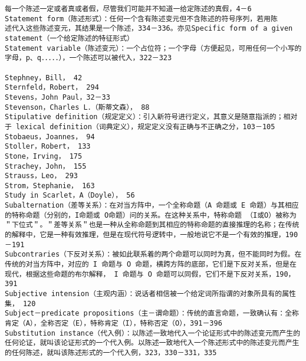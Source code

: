 \begin{verbatim}
每一个陈述一定或者真或者假，尽管我们可能并不知道一给定陈述的真假，4－6
Statement form（陈述形式）：任何一个含有陈述变元但不含陈述的符号序列，若用陈
述代入这些陈述变元，其结果是一个陈述，334－336。亦见Specific form of a given statement（一个给定陈述的特征形式）
Statement variable（陈述变元）：一个占位符；一个字母（方便起见，可用任何一个小写的字母，p、q．．．．．），一个陈述可以被代入，322－323

Stephney，Bill， 42
Sternfeld，Robert， 294
Stevens，John Paul，32－33
Stevenson，Charles L．（斯蒂文森）， 88
Stipulative definition（规定定义）：引入新符号进行定义，其意义是随意指派的；相对于 lexical definition（词典定义），规定定义没有正确与不正确之分，103－105
Stobaeus，Joannes， 94
Stoller，Robert， 133
Stone，Irving， 175
Strachey，John， 155
Strauss，Leo， 293
Strom，Stephanie， 163
Study in Scarlet，A（Doyle）， 56
Subalternation（差等关系）：在对当方阵中，一个全称命题（A 命题或 E 命题）与其相应的特称命题（分别的，I命题或 O命题）问的关系。在这种关系中，特称命题 （I或O）被称为＂下位式＂。＂差等关系＂也是一种从全称命题到其相应的特称命题的直接推理的名称；在传统的解释中，它是一种有效推理，但是在现代符号逻转中，一般地说它不是一个有效的推理，190－191
Subcontraries（下反对关系）：被如此联系着的两个命题可以同时为真，但不能同时为假。在传统的对当方阵中，对应的 I 命题与 O 命题，横跨方阵的底部，它们是下反对关系，但是在现代，根据这些命题的布尔解释， I 命题与 O 命题可以同假，它们不是下反对关系，190，391
Subjective intension（主观内涵）：说话者相信被一个给定词所指谓的对象所具有的属性集， 120
Subject－predicate propositions（主－谓命题）：传统的直言命题，一致确认有：全称肯定（A），全称否定（E），特称肯定（I），特称否定（O），391－396
Substitution instance（代入例）：以陈述一致地代入一个论证形式中的陈述变元而产生的任何论证，就叫该论证形式的一个代入例。以陈述一致地代入一个陈述形式中的陈述变元而产生的任何陈述，就叫该陈述形式的一个代入例，323，330－331，335


\end{verbatim}
